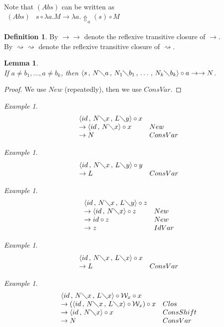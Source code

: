 \documentclass[11pt]{amsart}
\theoremstyle{plain}
\newtheorem{lemma}[theorem]{Lemma}
\theoremstyle{definition}
\newtheorem{definition}[theorem]{Definition}
\theoremstyle{remark}
\newtheorem{example}[theorem]{Example}
\numberwithin{equation}{section}
\newcommand{\ci}{\circ}
\newcommand{\ri}{\rightsquigarrow}
\newcommand{\mi}{\,,\,}
\newcommand{\is}{\diagdown}
\newcommand{\arrow}{\rightarrow}
\newcommand{\la}{\langle}
\newcommand{\ra}{\rangle}
\newcommand{\twoh}{\arrow\arrow}
\newcommand{\x}{a}
\newcommand{\y}{b}
\renewcommand{\pi}{\mathcal{W}}
\begin{document}
Note that $(Abs)$ can be written as\\
$
\begin{array}{ll}
(Abs) & s\ci \lambda \x.M\rightarrow\lambda
\x.\!\Uparrow_{\x}\!(s) \ci M
\end{array}
$
\begin{definition}By $\twoh$ denote the reflexive transitive
closure of $\arrow$.\\
By $\ri\ri$ denote the reflexive transitive closure of $\ri$.
\end{definition}
\begin{lemma}$ $\\
If $\x\neq \y_1, \ldots, \x\neq \y_k$,
then
 $\la s\mi N\is \x\mi N_1\is \y_1\mi\ldots\mi N_k\is \y_k\ra\ci
\x\twoh N$.
\end{lemma}
\begin{proof}We use $New$ (repeatedly), then we use $ConsVar$.
\end{proof}
\begin{example}$$\begin{array}{ll}
\langle id\mi N\is x\mi L\is y\rangle\ci x &
\\
\rightarrow\langle id\mi N\is x\rangle\ci x &
New\\
\rightarrow N & ConsVar
\end{array}$$
\end{example}
\begin{example}$$\begin{array}{ll}
\langle id\mi N\is x\mi L\is y\rangle\ci y &
\\
\rightarrow L & ConsVar
\end{array}$$
\end{example}
\begin{example}$$\begin{array}{ll}
\langle id\mi N\is x\mi L\is y\rangle\ci z &
\\
\rightarrow\langle id\mi N\is x\rangle\ci z &
New\\
\rightarrow id\ci z & New\\
\rightarrow z & IdVar
\end{array}$$
\end{example}
\begin{example}$$\begin{array}{ll}
\langle id\mi N\is x\mi L\is x\rangle\ci x &
\\
\rightarrow L & ConsVar
\end{array}$$
\end{example}
\begin{example}$$\begin{array}{ll}
\langle id\mi N\is x\mi L\is x\rangle\ci \pi_x\ci x &
\\
\arrow(\langle id\mi N\is x\mi L\is x\rangle\ci \pi_x)\ci x &
Clos\\
\arrow \langle id\mi N\is x\ra\ci x &
ConsShift\\
\rightarrow N & ConsVar
\end{array}$$
\end{example}
\end{document}
